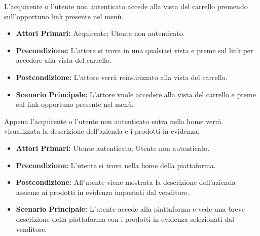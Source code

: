 L'acquirente o l'utente non autenticato accede alla vista del carrello premendo sull'opportuno link presente nel menù.
\begin{itemize}
    \item \textbf{Attori Primari:} Acquirente; Utente non autenticato.
    \item \textbf{Precondizione:} L'attore si trova in una qualsiasi vista e preme sul link per accedere alla vista del carrello.
    \item \textbf{Postcondizione:} L'attore verrà reindirizzato alla vista del carrello.
    \item \textbf{Scenario Principale:} L'attore vuole accedere alla vista del carrello e preme sul link opportuno presente nel menù.
\end{itemize}

Appena l'acquirente o l'utente non autenticato entra nella home verrà visualizzata la descrizione dell'azienda e i prodotti in evidenza.
\begin{itemize}
    \item \textbf{Attori Primari:} Utente autenticato; Utente non autenticato.
    \item \textbf{Precondizione:} L'utente si trova nella home della piattaforma.
    \item \textbf{Postcondizione:} All'utente viene mostrata la descrizione dell'azienda assieme ai prodotti in evidenza impostati dal venditore.
    \item \textbf{Scenario Principale:} L'utente accede alla piattaforma e vede una breve descrizione della piattaforma con i prodotti in evidenza selezionati dal venditore.
\end{itemize}

